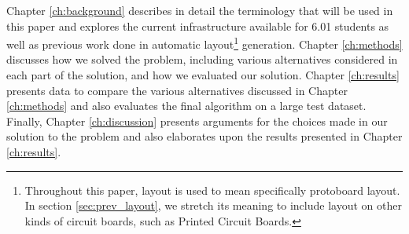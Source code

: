 Chapter \ref{ch:background} describes in detail the terminology that will be
used in this paper and explores the current infrastructure available for
6.01 students as well as previous work done in automatic layout\footnote{
Throughout this paper, layout is used to
mean specifically protoboard layout. In section \ref{sec:prev_layout}, we
stretch its meaning to include layout on other kinds of circuit boards,
such as Printed Circuit Boards.} generation.
Chapter \ref{ch:methods} discusses how we solved the problem, including various
alternatives considered in each part of the solution, and how we evaluated
our solution. Chapter \ref{ch:results} presents data to compare the various
alternatives discussed in Chapter \ref{ch:methods} and also evaluates the final
algorithm on a large test dataset. Finally, Chapter \ref{ch:discussion}
presents arguments for the choices made in our solution to the problem and
also elaborates upon the results presented in Chapter \ref{ch:results}.

%

